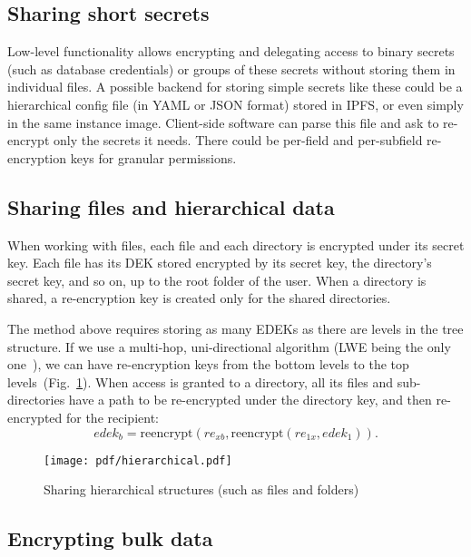 \documentclass[longbibliography,nofootinbib]{revtex4-1}
\newcommand{\figref}[1]{Fig.~\ref{#1}}
\begin{document}
\subsection{Sharing short secrets}

Low-level functionality allows encrypting and delegating access to binary secrets (such as database credentials) or groups of these secrets without
storing them in individual files.
A possible backend for storing simple secrets like these could be a hierarchical config file (in YAML or JSON format) stored in IPFS,
or even simply in the same instance image.
Client-side software can parse this file and ask to re-encrypt only the secrets it needs.
There could be per-field and per-subfield re-encryption keys for granular permissions.

\subsection{Sharing files and hierarchical data}
\label{sec:hierarchical-data}

When working with files, each file and each directory is encrypted under its secret key.
Each file has its DEK stored encrypted by its secret key, the directory's secret key, and so on, up to the root folder of the user.
When a directory is shared, a re-encryption key is created only for the shared directories.

The method above requires storing as many EDEKs as there are levels in the tree structure.
If we use a multi-hop, uni-directional algorithm (LWE being the only one~\cite{lwe-reencryption}), we can have re-encryption keys from the bottom levels to
the top levels~(\figref{fig:hierarchical-pre}).
When access is granted to a directory, all its files and sub-directories have a path to be re-encrypted under the directory key, and then re-encrypted for the
recipient:
\begin{equation}
    edek_b = \text{reencrypt}(re_{xb}, \text{reencrypt}(re_{1x}, edek_1)).
\end{equation}
\begin{figure}
\centering
    \texttt{[image: pdf/hierarchical.pdf]}
    \caption{Sharing hierarchical structures (such as files and folders)}
    \label{fig:hierarchical-pre}
\end{figure}

\subsection{Encrypting bulk data}
\end{document}
